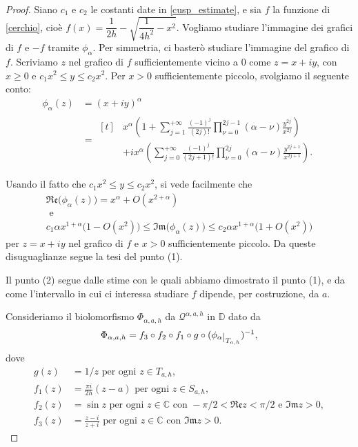 \begin{proof}
    Siano $c_1$ e $c_2$ le costanti date in \eqref{cusp_estimate}, e sia $f$ la funzione di \eqref{cerchio}, cioè $f(x)=\dfrac{1}{2h}-\sqrt{\dfrac{1}{4h^2}-x^2}$. Vogliamo studiare l'immagine dei grafici di $f$ e $-f$ tramite $\phi_\alpha$. Per simmetria, ci basterò studiare l'immagine del grafico di $f$. Scriviamo $z$ nel grafico di $f$ sufficientemente vicino a $0$ come $z=x+iy$, con $x \ge 0$ e $c_1x^2\le y\le c_2x^2$. Per $x>0$ sufficientemente piccolo, svolgiamo il seguente conto:
    \begin{align*}
        \phi_\alpha(z)&=(x+iy)^{\alpha}\\
        &=\begin{aligned}[t]&x^{\alpha}\left(1+\sum_{j=1}^{+\infty}\frac{(-1)^j}{(2j)!}\prod_{\nu=0}^{2j-1}(\alpha-\nu)\frac{y^{2j}}{x^{2j}}\right)\\
        &+ix^{\alpha}\left(\sum_{j=0}^{+\infty}\frac{(-1)^j}{(2j+1)!}\prod_{\nu=0}^{2j}(\alpha-\nu)\frac{y^{2j+1}}{x^{2j+1}}\right).\end{aligned}
    \end{align*}

    Usando il fatto che $c_1x^2\le y\le c_2x^2$, si vede facilmente che
    \begin{gather*}
        \mathfrak{Re}\big(\phi_\alpha(z)\big)=x^\alpha+O(x^{2+\alpha})\\
        \text{ e }\\
        c_1\alpha x^{1+\alpha}\big(1-O(x^2)\big) \le \mathfrak{Im}\big(\phi_\alpha(z)\big) \le c_2\alpha x^{1+\alpha}\big(1+O(x^2)\big)
    \end{gather*}
    per $z=x+iy$ nel grafico di $f$ e $x>0$ sufficientemente piccolo. Da queste disuguaglianze segue la tesi del punto (1).

    Il punto (2) segue dalle stime con le quali abbiamo dimostrato il punto (1), e da come l'intervallo in cui ci interessa studiare $f$ dipende, per costruzione, da $a$.

    Consideriamo il biolomorfismo $\Phi_{\alpha,a,h}$ da $\mathcal{Q}^{\alpha,a,h}$ in $\mathbb{D}$ dato da
    $$\Phi_{\alpha,a,h}=f_3\circ f_2\circ f_1\circ g\circ(\phi_\alpha\restrict{T_{a,h}})^{-1},$$
    dove
    \begin{align*}
        g(z)&=1/z\text{ per ogni }z\in T_{a,h},\\
        f_1(z)&=\frac{\pi i}{2h}(z-a)\text{ per ogni }z\in S_{a,h},\\
        f_2(z)&=\sin{z}\text{ per ogni }z\in \mathbb{C}\text{ con }-\pi/2<\mathfrak{Re}z<\pi/2\text{ e }\mathfrak{Im}z>0,\\
        f_3(z)&=\frac{z-i}{z+i}\text{ per ogni }z\in\mathbb{C}\text{ con }\mathfrak{Im}z>0.
    \end{align*}


\end{proof}

